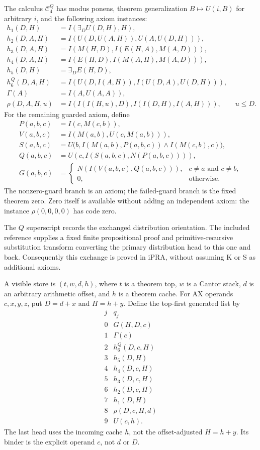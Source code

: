 \documentclass[11pt,a4paper]{article}
\newcommand{\ipra}{\mathrm{iPRA}}
\newcommand{\file}[1]{\texttt{\path{#1}}}
\begin{document}
The calculus $\mathcal C^Q_4$ has modus ponens, theorem
generalization $B\mapsto U(i,B)$ for arbitrary $i$, and the following
axiom instances:
\begin{align*}
 h_1(D,H)&=I(\exists_D U(D,H),H),\\
 h_2(D,A,H)&=I(U(D,U(A,H)),U(A,U(D,H))),\\
 h_3(D,A,H)&=I(M(H,D),I(E(H,A),M(A,D))),\\
 h_4(D,A,H)&=I(E(H,D),I(M(A,H),M(A,D))),\\
 h_5(D,H)&=\exists_D E(H,D),\\
 h_6^Q(D,A,H)&=I(U(D,I(A,H)),I(U(D,A),U(D,H))),\\
 \Gamma(A)&=I(A,U(A,A)),\\
 \rho(D,A,H,u)&=I(I(I(H,u),D),I(I(D,H),I(A,H))),
                    \qquad u\le D.
\end{align*}
For the remaining guarded axiom, define
\begin{align*}
 P(a,b,c)&=I(c,M(c,b)),\\
 V(a,b,c)&=I(M(a,b),U(c,M(a,b))),\\
 S(a,b,c)&=U\bigl(b,I(M(a,b),P(a,b,c))\wedge I(M(c,b),c)\bigr),\\
 Q(a,b,c)&=U(c,I(S(a,b,c),N(P(a,b,c)))),\\
 G(a,b,c)&=
 \begin{cases}
 N(I(V(a,b,c),Q(a,b,c))),&c\ne a\text{ and }c\ne b,\\
 0,&\text{otherwise}.
 \end{cases}
\end{align*}
The nonzero-guard branch is an axiom; the failed-guard branch is the
fixed theorem zero. Zero itself is available without adding an
independent axiom: the instance $\rho(0,0,0,0)$ has code zero.

The $Q$ superscript records the exchanged distribution orientation.
The included reference \file{q_exchange_ipra.tex} supplies a fixed
finite propositional proof and primitive-recursive substitution
transform converting the primary distribution head to this one and
back. Consequently this exchange is proved in $\ipra$, without
assuming K or S as additional axioms.

A visible store is $(t,w,d,h)$, where $t$ is a theorem top, $w$ is a
Cantor stack, $d$ is an arbitrary arithmetic offset, and $h$ is a theorem
cache. For AX operands $c,x,y,z$, put
$D=d+x$ and $H=h+y$. Define the top-first generated list by
\[
\begin{array}{c|l}
j&q_j\\\hline
0&G(H,D,c)\\
1&\Gamma(c)\\
2&h_6^Q(D,c,H)\\
3&h_5(D,H)\\
4&h_4(D,c,H)\\
5&h_3(D,c,H)\\
6&h_2(D,c,H)\\
7&h_1(D,H)\\
8&\rho(D,c,H,d)\\
9&U(c,h).
\end{array}
\]
The last head uses the incoming cache $h$, not the offset-adjusted
$H=h+y$. Its binder is the explicit operand $c$, not $d$ or $D$.
\end{document}
